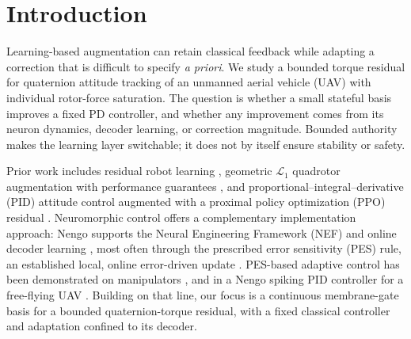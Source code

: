 \documentclass[letterpaper, 10 pt, conference]{ieeeconf}
\begin{document}
\begin{abstract}
Online neuromorphic residual control can augment a classical attitude controller under abrupt missions or unforeseen disturbances without changing its feedback gains or actuator interface. We present six continuous coupled membrane-gate (CMG) units and eighteen decoder weights adapted by prescribed error sensitivity (PES), adding a bounded correction to the saturated quaternion proportional-derivative (PD) torque request before rotor-force allocation. Across ten matched 45-second MuJoCo cases on the Skydio X2 and a Crazyflie~2 derived model, mean quaternion-angle error decreases by 17.3--60.6\%, including approximately 53--57\% reductions on the Full3 and Hard45 multi-axis tracking missions. Direct and Nengo implementations agree closely. Benchmarks against LIF, ALIF, Izhikevich, and LIFRate neuron models expose an effort-accuracy tradeoff: CMG--PES attains better tracking with substantially lower realized residual effort. Under synthetic measurement noise, the error reductions persist, and learned corrections are reused across repeated disturbances. Overall, PD provides a nominal, interpretable reference, while the online residual adds bounded, revocable adaptation that improves robustness to disturbances and noisy measurements.
\end{abstract}

\section{Introduction}

Learning-based augmentation can retain classical feedback while adapting a correction that is difficult to specify \emph{a priori}. We study a bounded torque residual for quaternion attitude tracking of an unmanned aerial vehicle (UAV) with individual rotor-force saturation. The question is whether a small stateful basis improves a fixed PD controller, and whether any improvement comes from its neuron dynamics, decoder learning, or correction magnitude. Bounded authority makes the learning layer switchable; it does not by itself ensure stability or safety.

Prior work includes residual robot learning \cite{johannink2019}, geometric $\mathcal L_1$ quadrotor augmentation with performance guarantees \cite{wu2025l1quad}, and proportional--integral--derivative (PID) attitude control augmented with a proximal policy optimization (PPO) residual \cite{li2027hpappo}.
%
Neuromorphic control offers a complementary implementation approach: Nengo supports the Neural Engineering Framework (NEF) and online decoder learning \cite{bekolay2014nengo}, most often through the prescribed error sensitivity (PES) rule, an established local, online error-driven update \cite{voelker2015pes}. PES-based adaptive control has been demonstrated on manipulators \cite{dewolf2016arm,dewolf2020nengo}, and in a Nengo spiking PID controller for a free-flying UAV \cite{olivares2026selftuning}.  
Building on that line, our focus is a continuous membrane-gate basis for a bounded quaternion-torque residual, with a fixed classical controller and adaptation confined to its decoder.
\end{document}
